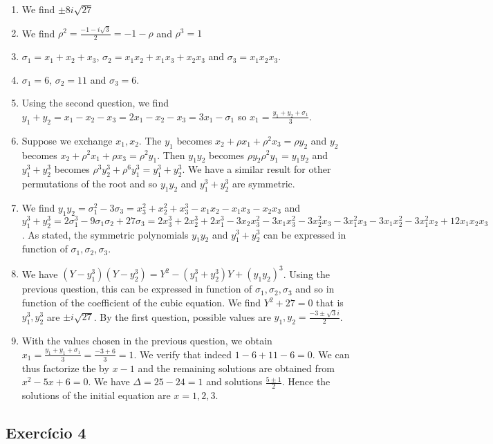 \begin{enumerate}
\item We find $\pm 8i\sqrt{27}$
\item We find $\rho^2 = \frac{-1-i\sqrt{3}}{2} = -1 - \rho$ and $\rho^3 = 1$
\item $\sigma_1=x_1+x_2+x_3$, $\sigma_2=x_1x_2 + x_1x_3 + x_2x_3$ and
  $\sigma_3 = x_1 x_2 x_3$.
\item $\sigma_1=6$, $\sigma_2=11$ and $\sigma_3 = 6$.
\item Using the second question, we find
  $y_1+y_2=x_1-x_2-x_3=2x_1-x_2-x_3 = 3x_1 - \sigma_1$ so
  $x_1 = \frac{y_1+y_2+\sigma_1}{3}$.
\item Suppose we exchange $x_1,x_2$. The $y_1$ becomes
  $x_2+\rho x_1+\rho^2 x_3 = \rho y_2$ and
  $y_2$ becomes $x_2 + \rho^2 x_1 + \rho x_3 = \rho^2 y_1$.
  Then $y_1y_2$ becomes $\rho y_2 \rho^2 y_1 = y_1y_2$
  and $y_1^3+y_2^3$ becomes $\rho^3 y_2^3 + \rho^6 y_1^3 = y_1^3+y_2^3$.
  We have a similar result for other permutations of the root and so
  $y_1y_2$ and $y_1^3+y_2^3$ are symmetric.
\item We find
  $y_1y_2=\sigma_1^2-3\sigma_3=x_3^2+x_2^2+x_3^3-x_1x_2-x_1x_3-x_2x_3$ and
  $y_1^3+y_2^3 = 2\sigma_1^3-9\sigma_1\sigma_2+27\sigma_3 =
  2x_3^3+2x_2^3+2x_1^3-3x_2x_3^2-3x_1x_3^2-3x_2^2x_3-3x_1^2x_3-3x_1x_2^2-3x_1^2x_2+12x_1x_2x_3$. As stated, the symmetric polynomials $y_1y_2$ and
  $y_1^3+y_2^3$ can be expressed in function of $\sigma_1,\sigma_2,\sigma_3$.
\item We have ${(Y-y_1^3)}{(Y-y_2^3)} = Y^2 - {(y_1^3 + y_2^3)} Y + {(y_1y_2)}^3$.
  Using the previous question, this can be expressed in function of
  $\sigma_1,\sigma_2,\sigma_3$ and so in function of the coefficient of
  the cubic equation. We find
  $Y^2 + 27 = 0$ that is $y_1^3, y_2^3$ are $\pm i \sqrt{27}$.
  By the first question, possible values are
  $y_1,y_2 = \frac{-3\pm\sqrt{3}i}{2}$.
\item With the values chosen in the previous question, we obtain
  $x_1=\frac{y_1+y_1+\sigma_1}{3} = \frac{-3+6}{3} = 1$. We verify that indeed
  $1-6+11-6=0$. We can thus factorize the by $x-1$ and the remaining solutions
  are obtained from $x^2-5x+6 = 0$. We have $\Delta = 25-24=1$
  and solutions $\frac{5\pm1}{2}$. Hence the solutions of the initial equation
  are $x=1,2,3$.
\end{enumerate}

\subsection*{Exercício 4}

